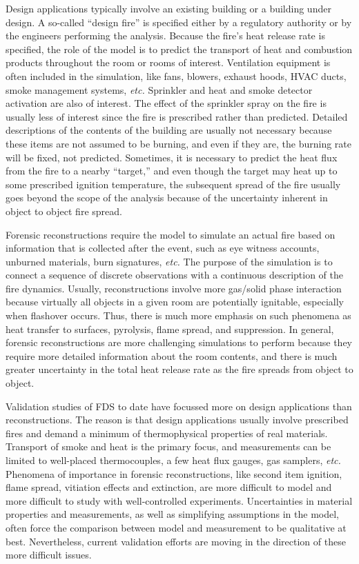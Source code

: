 Design  applications  typically  involve  an existing  building  or  a
building  under  design. A  so-called  ``design  fire'' is  specified
either by  a regulatory authority  or by the engineers  performing the
analysis. Because the  fire's heat release rate is  specified, the role of
the model is to predict  the transport of heat and combustion products
throughout  the room or  rooms of  interest. Ventilation  equipment is
often included  in the simulation, like fans,  blowers, exhaust hoods,
HVAC ducts,  smoke management systems,  {\em etc.} Sprinkler  and heat
and smoke detector activation are also of interest.  The effect of the
sprinkler spray on the fire is usually less of interest since the fire
is  prescribed rather  than  predicted. Detailed  descriptions of  the
contents of the building are usually not necessary because these items
are not assumed to be burning,  and even if they are, the burning rate
will be  fixed, not predicted.  Sometimes, it is necessary  to predict
the heat  flux from the fire  to a nearby ``target,''  and even though
the target  may heat up  to some prescribed ignition  temperature, the
subsequent spread  of the  fire usually goes  beyond the scope  of the
analysis because of the uncertainty  inherent in object to object fire
spread.

Forensic reconstructions require the  model to simulate an actual fire
based on  information that is collected  after the event,  such as eye
witness accounts, unburned materials,  burn signatures, {\em etc.} The
purpose  of  the simulation  is  to  connect  a sequence  of  discrete
observations  with  a continuous  description  of  the fire  dynamics.
Usually,  reconstructions  involve  more gas/solid  phase  interaction
because  virtually  all  objects  in  a  given  room  are  potentially
ignitable, especially when flashover  occurs. Thus, there is much more
emphasis on  such phenomena as  heat transfer to  surfaces, pyrolysis,
flame  spread, and suppression.  In general,  forensic reconstructions
are more challenging simulations  to perform because they require more
detailed  information  about the  room  contents,  and  there is  much
greater uncertainty in the total heat release rate as the fire spreads
from object to object.

Validation  studies  of FDS  to  date  have  focussed more  on  design
applications   than  reconstructions.  The   reason  is   that  design
applications usually involve prescribed  fires and demand a minimum of
thermophysical properties  of real materials.  Transport  of smoke and
heat  is  the  primary  focus,  and measurements  can  be  limited  to
well-placed thermocouples, a few  heat flux gauges, gas samplers, {\em
etc.} Phenomena of importance in forensic reconstructions, like second
item  ignition, flame  spread, vitiation  effects and  extinction, are
more   difficult  to   model  and   more  difficult   to   study  with
well-controlled experiments. Uncertainties  in material properties and
measurements, as  well as simplifying assumptions in  the model, often
force the  comparison between model and measurement  to be qualitative
at best.  Nevertheless, current validation  efforts are moving  in the
direction of these more difficult issues.




